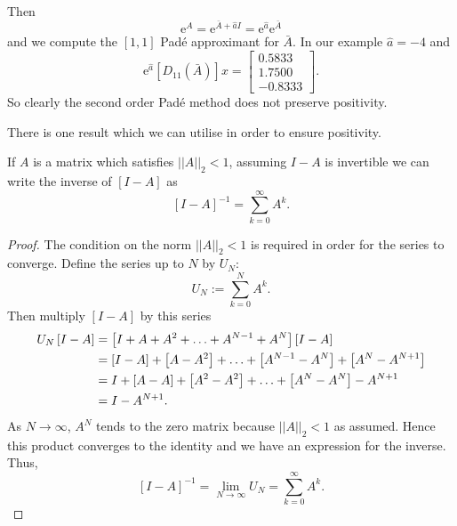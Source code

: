 Then
\begin{equation*}
    \mathrm{e}^A = \mathrm{e}^{\bar{A} + \hat{a}I} = \mathrm{e}^{\hat{a}} \mathrm{e}^{\bar{A}}
\end{equation*}
and we compute the $[1,1]$ Pad\'e approximant for $\bar{A}$.
In our example $\hat{a} = -4$ and
\begin{equation*}
    \mathrm{e}^{\hat{a}} [D_{11}(\bar{A})] x = \begin{bmatrix}
        0.5833 \\
        1.7500 \\
       -0.8333
    \end{bmatrix}.
\end{equation*}
So clearly the second order Pad\'e method does not preserve positivity.

There is one result which we can utilise in order to ensure positivity.
\begin{lemma}
    \label{lem:positiveinverse}
    If $A$ is a matrix which satisfies $||A||_2 < 1$, assuming $I-A$ is invertible we can write the inverse of $[I-A]$ as
    \begin{equation*}
        \left[ I - A \right]^{-1} = \sum_{k=0}^{\infty} A^k.
    \end{equation*}
\end{lemma}
\begin{proof}
    The condition on the norm $||A||_2 < 1$ is required in order for the series to converge.
    Define the series up to $N$ by $U_N:$
    \begin{equation*}
        U_N := \sum_{k=0}^{N} A^k.
    \end{equation*}
    Then multiply $[I-A]$ by this series
    \begin{align*}
        U_N \left[ I-A \right] &= \left[ I + A + A^2 + \mathellipsis + A^{N-1} + A^N \right] \left[ I - A \right] \\
        &= [I-A] + \left[ A-A^2 \right] + \mathellipsis + \left[ A^{N-1} - A^N \right] + \left[ A^N - A^{N+1} \right] \\
        &= I + [A-A] + \left[ A^2 - A^2 \right] + \mathellipsis + \left[ A^N - A^N \right] - A^{N+1} \\
        &= I - A^{N+1}.
    \end{align*}
    As $N \rightarrow \infty$, $A^N$ tends to the zero matrix because $||A||_2 < 1$ as assumed.
    Hence this product converges to the identity and we have an expression for the inverse.
    Thus,
    \begin{equation*}
        \left[ I - A \right]^{-1} = \lim_{N\rightarrow \infty}U_N = \sum_{k=0}^{\infty} A^k.
    \end{equation*}
\end{proof}
